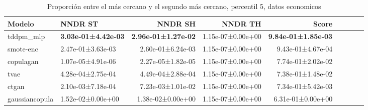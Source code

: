 \begin{table}[H]
\centering
\fontsize{10}{14}\selectfont
\caption{Proporción entre el más cercano y el segundo más cercano, percentil 5, datos economicos}
\label{table-dcr-economicos-b}
\begin{tabular}{|l|l|r|r|r|r|r|r|r|}
\hline
\rowcolor[gray]{0.8}
Modelo & NNDR ST & NNDR SH & NNDR TH & \textbf{Score} \\
\hline tddpm\_mlp & \bfseries 3.03e-01±4.42e-03 & \bfseries 2.96e-01±1.27e-02 & 1.15e-07±0.00e+00 & \bfseries 9.84e-01±1.85e-03 \\
\hline smote-enc & 2.47e-01±3.63e-03 & 2.60e-01±6.24e-03 & 1.15e-07±0.00e+00 & 9.43e-01±4.67e-04 \\
\hline copulagan & \cellcolor[rgb]{0.9, 0.54, 0.52} 1.07e-05±4.91e-06 & \cellcolor[rgb]{0.9, 0.54, 0.52} 2.27e-05±1.82e-05 & 1.15e-07±0.00e+00 & 7.74e-01±2.02e-02 \\
\hline tvae & 4.28e-04±2.75e-04 & 4.49e-04±2.88e-04 & 1.15e-07±0.00e+00 & 7.38e-01±1.48e-02 \\
\hline ctgan & 2.10e-03±7.18e-04 & 7.23e-03±1.01e-02 & 1.15e-07±0.00e+00 & 7.34e-01±5.42e-03 \\
\hline gaussiancopula & 1.52e-02±0.00e+00 & 1.38e-02±0.00e+00 & 1.15e-07±0.00e+00 & \cellcolor[rgb]{0.9, 0.54, 0.52} 6.31e-01±0.00e+00 \\
\hline
\end{tabular}
\end{table}
